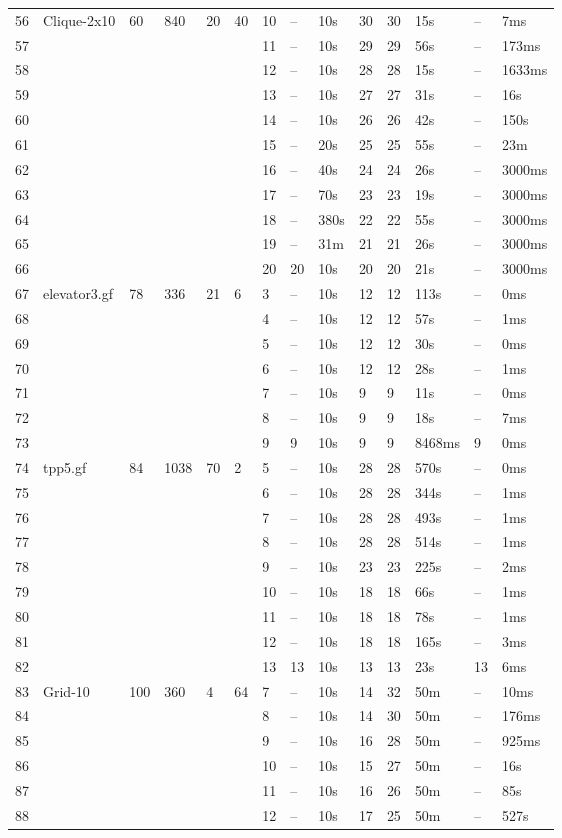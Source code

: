 \documentclass{article}
\begin{document}
\begin{longtable}{|l |l |l |l |l |l |l |l |l |l |l |l |l |l |}
56&Clique-2x10&60&840&20&40&10&--&10s&30&30&15s&--&7ms\\
57&&&&&&11&--&10s&29&29&56s&--&173ms\\
58&&&&&&12&--&10s&28&28&15s&--&1633ms\\
59&&&&&&13&--&10s&27&27&31s&--&16s\\
60&&&&&&14&--&10s&26&26&42s&--&150s\\
61&&&&&&15&--&20s&25&25&55s&--&23m\\
62&&&&&&16&--&40s&24&24&26s&--&3000ms\\
63&&&&&&17&--&70s&23&23&19s&--&3000ms\\
64&&&&&&18&--&380s&22&22&55s&--&3000ms\\
65&&&&&&19&--&31m&21&21&26s&--&3000ms\\
66&&&&&&20&20&10s&20&20&21s&--&3000ms\\
67&elevator3.gf&78&336&21&6&3&--&10s&12&12&113s&--&0ms\\
68&&&&&&4&--&10s&12&12&57s&--&1ms\\
69&&&&&&5&--&10s&12&12&30s&--&0ms\\
70&&&&&&6&--&10s&12&12&28s&--&1ms\\
71&&&&&&7&--&10s&9&9&11s&--&0ms\\
72&&&&&&8&--&10s&9&9&18s&--&7ms\\
73&&&&&&9&9&10s&9&9&8468ms&9&0ms\\
74&tpp5.gf&84&1038&70&2&5&--&10s&28&28&570s&--&0ms\\
75&&&&&&6&--&10s&28&28&344s&--&1ms\\
76&&&&&&7&--&10s&28&28&493s&--&1ms\\
77&&&&&&8&--&10s&28&28&514s&--&1ms\\
78&&&&&&9&--&10s&23&23&225s&--&2ms\\
79&&&&&&10&--&10s&18&18&66s&--&1ms\\
80&&&&&&11&--&10s&18&18&78s&--&1ms\\
81&&&&&&12&--&10s&18&18&165s&--&3ms\\
82&&&&&&13&13&10s&13&13&23s&13&6ms\\
83&Grid-10&100&360&4&64&7&--&10s&14&32&50m&--&10ms\\
84&&&&&&8&--&10s&14&30&50m&--&176ms\\
85&&&&&&9&--&10s&16&28&50m&--&925ms\\
86&&&&&&10&--&10s&15&27&50m&--&16s\\
87&&&&&&11&--&10s&16&26&50m&--&85s\\
88&&&&&&12&--&10s&17&25&50m&--&527s\\

\end{longtable}
\end{document}
